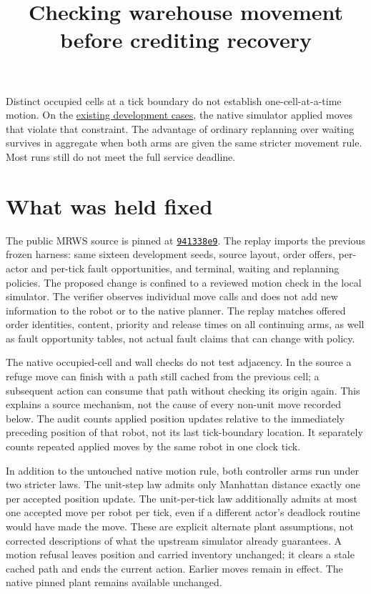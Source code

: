 \documentclass[11pt]{article}
\title{Checking warehouse movement before crediting recovery}
\date{}
\begin{document}
\maketitle

Distinct occupied cells at a tick boundary do not establish
one-cell-at-a-time motion. On the
\href{https://github.com/eternal-november/eos-research-programmes/pull/402}
{existing development cases}, the native simulator applied
moves that violate that constraint. The advantage of ordinary
replanning over waiting survives in aggregate when both arms
are given the same stricter movement rule. Most runs still do
not meet the full service deadline.

\section{What was held fixed}
The public MRWS source is pinned at
\href{https://github.com/automaticdai/MRWS_MultiRobot_Warehouse_Scheduling/tree/941338e9ea4c4eaebb87f8374f80fd576497ad01}
{\texttt{941338e9}}. The replay imports the previous frozen
harness: same sixteen development seeds, source layout, order
offers, per-actor and per-tick fault opportunities, and
terminal, waiting and replanning policies. The proposed change
is confined to a reviewed motion check in the local simulator.
The verifier observes individual move calls and does not add
new information to the robot or to the native planner. The
replay matches offered order identities, content, priority and release times
on all continuing arms, as well as fault opportunity tables,
not actual fault claims that can change with policy.

The native occupied-cell and wall checks do not test adjacency.
In the source a refuge move can finish with a path still cached
from the previous cell; a subsequent action can consume that
path without checking its origin again. This explains a source
mechanism, not the cause of every non-unit move recorded below.
The audit counts applied position updates relative to the
immediately preceding position of that robot, not its last
tick-boundary location. It separately counts repeated applied
moves by the same robot in one clock tick.

In addition to the untouched native motion rule, both controller
arms run under two stricter laws. The unit-step law admits only
Manhattan distance exactly one per accepted position update.
The unit-per-tick law additionally admits at most one accepted
move per robot per tick, even if a different actor's deadlock
routine would have made the move. These are explicit alternate
plant assumptions, not corrected descriptions of what the
upstream simulator already guarantees. A motion refusal leaves
position and carried inventory unchanged; it clears a stale
cached path and ends the current action. Earlier moves remain
in effect. The native pinned plant remains available unchanged.
\end{document}
